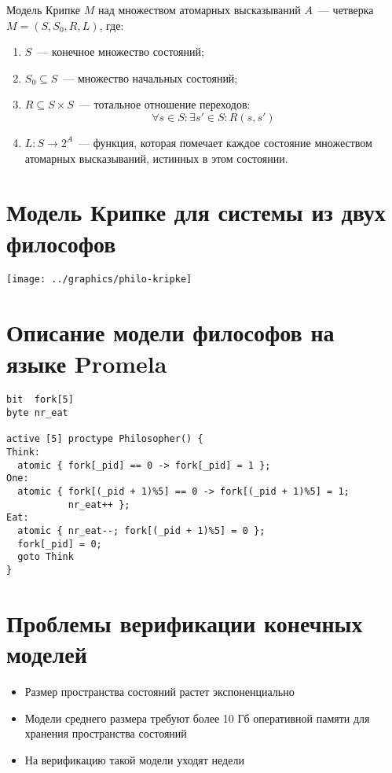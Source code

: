 \documentclass[12pt]{article}
\begin{document}
Модель Крипке $M$ над множеством атомарных высказываний $A$~--- четверка $M=(S, S_0, R,
L)$, где:
\begin{enumerate}
\item $S$~--- конечное множество состояний;
\item $S_0 \subseteq S$~--- множество начальных состояний;
\item $R \subseteq S \times S$~--- тотальное отношение переходов: $$\forall s \in S\colon \exists
  s' \in S \colon R(s, s')$$
\item $L: S \rightarrow 2^{A}$~--- функция, которая помечает каждое состояние множеством
  атомарных высказываний, истинных в этом состоянии.
\end{enumerate}

\section{Модель Крипке для системы из двух философов}
\label{sec:kripke-philo}

\begin{center}
  \texttt{[image: ../graphics/philo-kripke]}
\end{center}

\section{Описание модели философов на языке Promela}
\label{sec:prml-philo}

\begin{lstlisting}[language=Promela,style=simplecode]
bit  fork[5]
byte nr_eat

active [5] proctype Philosopher() {
Think:
  atomic { fork[_pid] == 0 -> fork[_pid] = 1 };
One:
  atomic { fork[(_pid + 1)%5] == 0 -> fork[(_pid + 1)%5] = 1; 
           nr_eat++ };
Eat:
  atomic { nr_eat--; fork[(_pid + 1)%5] = 0 };
  fork[_pid] = 0;
  goto Think
}  
\end{lstlisting}

\section{Проблемы верификации конечных моделей}
\label{sec:verif-troubles}

\begin{itemize}
\item Размер пространства состояний растет экспоненциально

\item Модели среднего размера требуют более 10 Гб оперативной памяти для хранения пространства состояний

\item На верификацию такой модели уходят недели
\end{itemize}
\end{document}
